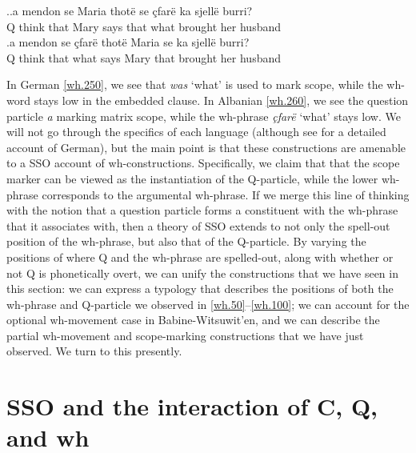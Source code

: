 \documentclass[11pt]{article}
\begin{document}
\ex.\label{wh.260}\ag.\label{wh.260a}a mendon se Maria thot\"e se \c{c}far\"e ka sjell\"e burri?\\
   Q think that Mary says that what brought her husband\\
   \bg.\label{wh.260b}a mendon se \c{c}far\"e thot\"e Maria se ka sjell\"e burri?\\
   Q think that what says Mary that brought her husband\\

In German \ref{wh.250}, we see that \textit{was} `what' is used to mark scope, while the wh-word stays low in the embedded clause. In Albanian \ref{wh.260}, we see the question particle \textit{a} marking matrix scope, while the wh-phrase \textit{\c{c}far\"e} `what' stays low. We will not go through the specifics of each language (although see \citealp{fanselow-cavar:2000} for a detailed account of German), but the main point is that these constructions are amenable to a SSO account of wh-constructions. Specifically, we claim that that the scope marker can be viewed as the instantiation of the Q-particle, while the lower wh-phrase corresponds to the argumental wh-phrase. If we merge this line of thinking with the notion that a question particle forms a constituent with the wh-phrase that it associates with, then a theory of SSO extends to not only the spell-out position of the wh-phrase, but also that of the Q-particle. By varying the positions of where Q and the wh-phrase are spelled-out, along with whether or not Q is phonetically overt, we can unify the constructions that we have seen in this section: we can express a typology that describes the positions of both the wh-phrase and Q-particle we observed in \ref{wh.50}--\ref{wh.100}; we can account for the optional wh-movement case in Babine-Witsuwit'en, and we can describe the partial wh-movement and scope-marking constructions that we have just observed. We turn to this presently.

\section{SSO and the interaction of C, Q, and wh}
\end{document}
